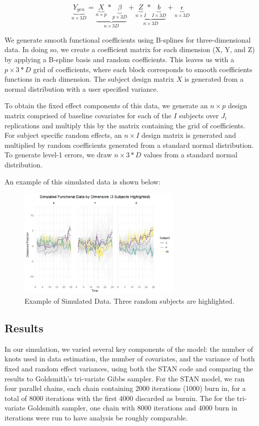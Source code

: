 \documentclass[AMA,Times1COL]{WileyNJDv5} %
\begin{document}
\begin{equation}
    \underbrace{Y_{gen}}_{n\times 3D} = \underbrace{\underbrace{X}_{n\times p}*\underbrace{\beta}_{p\times 3D}}_{n\times 3D} + \underbrace{\underbrace{Z}_{n\times I}*\underbrace{b}_{I\times 3D}}_{n\times 3D} + \underbrace{\epsilon}_{n\times 3D}
\end{equation}

We generate smooth functional coefficients using B-splines for three-dimensional data. In doing so, we create a coefficient matrix for each dimension (X, Y, and Z) by applying a B-spline basis and random coefficients.  This leaves us with a \(p\times 3*D\) grid of coefficients, where each block corresponds to smooth coefficients functions in each dimension.  The subject design matrix \(X\) is generated from a normal distribution with a user specified variance.  

To obtain the fixed effect components of this data, we generate an \(n\times p\) design matrix comprised of baseline covariates for each of the \(I\) subjects over \(J_i\) replications and multiply this by the matrix containing the grid of coefficients.  For subject specific random effects, an \(n\times I\) design matrix is generated and multiplied by random coefficients generated from a standard normal distribution.  To generate level-1 errors, we draw \(n\times 3*D\) values from a standard normal distribution. 

An example of this simulated data is shown below:

\begin{figure}[h]
    \centering
    \includegraphics[width = 0.7\textwidth]{simulated_dat.jpeg}
    \caption{Example of Simulated Data.  Three random subjects are highlighted.}
    \label{fig:sim_dat}
\end{figure}

\subsection{Results}
In our simulation, we varied several key components of the model: the number of knots used in data estimation, the number of covariates, and the variance of both fixed and random effect variances, using both the STAN code and comparing the results to Goldsmith's tri-variate Gibbs sampler.  For the STAN model, we ran four parallel chains, each chain containing 2000 iterations (1000) burn in, for a total of 8000 iterations with the first 4000 discarded as burnin.  The for the tri-variate Goldsmith sampler, one chain with 8000 iterations and 4000 burn in iterations were run to have analysis be roughly comparable.    
\end{document}
